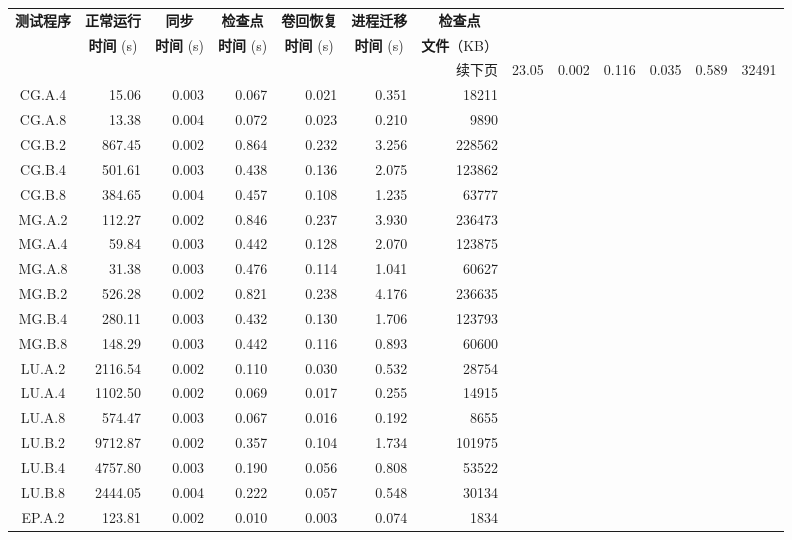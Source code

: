 \begin{ThreePartTable}
\begin{longtable}[c]{c*{6}{r}}
    \toprule
\textbf{测试程序\tnote{b}} & \multicolumn{1}{c}{\textbf{正常运行}} & \multicolumn{1}{c}{\textbf{同步}}
      & \multicolumn{1}{c}{\textbf{检查点}} & \multicolumn{1}{c}{\textbf{卷回恢复}}
      & \multicolumn{1}{c}{\textbf{进程迁移}} & \multicolumn{1}{c}{\textbf{检查点}} \\
    & \multicolumn{1}{c}{\textbf{时间} (s)} & \multicolumn{1}{c}{\textbf{时间} (s)}
      & \multicolumn{1}{c}{\textbf{时间} (s)} & \multicolumn{1}{c}{\textbf{时间} (s)}
      & \multicolumn{1}{c}{\textbf{时间} (s)} &  \textbf{文件}（KB）\\
    \midrule
    \endhead
    \hline
    \multicolumn{7}{r}{续下页}
    \endfoot
    \insertTableNotes
    \endlastfoot
    CG.C.2 & 23.05 & 0.002 & 0.116 & 0.035 & 0.589 & 32491 \\
CG.A.4 & 15.06 & 0.003 & 0.067 & 0.021 & 0.351 & 18211 \\
CG.A.8 & 13.38 & 0.004 & 0.072 & 0.023 & 0.210 & 9890 \\
CG.B.2 & 867.45 & 0.002 & 0.864 & 0.232 & 3.256 & 228562 \\
CG.B.4 & 501.61 & 0.003 & 0.438 & 0.136 & 2.075 & 123862 \\
CG.B.8 & 384.65 & 0.004 & 0.457 & 0.108 & 1.235 & 63777 \\
MG.A.2 & 112.27 & 0.002 & 0.846\tnote{a} & 0.237 & 3.930 & 236473 \\
MG.A.4 & 59.84 & 0.003 & 0.442 & 0.128 & 2.070 & 123875 \\
MG.A.8 & 31.38 & 0.003 & 0.476 & 0.114 & 1.041 & 60627 \\
MG.B.2 & 526.28 & 0.002 & 0.821 & 0.238 & 4.176 & 236635 \\
MG.B.4 & 280.11 & 0.003 & 0.432 & 0.130 & 1.706 & 123793 \\
MG.B.8 & 148.29 & 0.003 & 0.442 & 0.116 & 0.893 & 60600 \\
LU.A.2 & 2116.54 & 0.002 & 0.110 & 0.030 & 0.532 & 28754 \\
LU.A.4 & 1102.50 & 0.002 & 0.069 & 0.017 & 0.255 & 14915 \\
LU.A.8 & 574.47 & 0.003 & 0.067 & 0.016 & 0.192 & 8655 \\
LU.B.2 & 9712.87 & 0.002 & 0.357 & 0.104 & 1.734 & 101975 \\
LU.B.4 & 4757.80 & 0.003 & 0.190 & 0.056 & 0.808 & 53522 \\
LU.B.8 & 2444.05 & 0.004 & 0.222 & 0.057 & 0.548 & 30134 \\
EP.A.2 & 123.81 & 0.002 & 0.010 & 0.003 & 0.074 & 1834 \\

\end{longtable}
\end{ThreePartTable}
